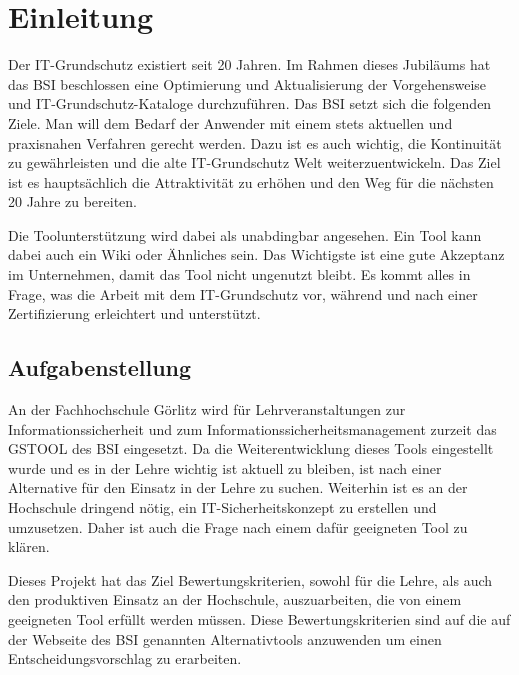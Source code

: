 \section{Einleitung}
Der IT-Grundschutz existiert seit 20 Jahren. Im Rahmen dieses Jubiläums hat das BSI beschlossen eine Optimierung und Aktualisierung der Vorgehensweise und IT-Grundschutz-Kataloge durchzuführen\cite{bsi}. Das BSI setzt sich die folgenden Ziele. Man will dem Bedarf der Anwender mit einem stets aktuellen und praxisnahen Verfahren gerecht werden. Dazu ist es auch wichtig, die Kontinuität zu gewährleisten und die alte IT-Grundschutz Welt weiterzuentwickeln. Das Ziel ist es hauptsächlich die Attraktivität zu erhöhen und den Weg für die nächsten 20 Jahre zu bereiten.

Die Toolunterstützung wird dabei als unabdingbar angesehen. Ein Tool kann dabei auch ein Wiki oder Ähnliches sein. Das Wichtigste ist eine gute Akzeptanz im Unternehmen, damit das Tool nicht ungenutzt bleibt. Es kommt alles in Frage, was die Arbeit mit dem IT-Grundschutz vor, während und nach einer Zertifizierung erleichtert und unterstützt.

\subsection{Aufgabenstellung}
An der Fachhochschule Görlitz wird für Lehrveranstaltungen zur Informationssicherheit und zum
Informationssicherheitsmanagement zurzeit das GSTOOL des BSI eingesetzt. Da die Weiterentwicklung dieses Tools eingestellt wurde und es in der Lehre wichtig ist aktuell zu bleiben, ist nach einer Alternative für den Einsatz in der Lehre zu suchen. 
Weiterhin ist es an der Hochschule dringend nötig, ein IT-Sicherheitskonzept zu erstellen und umzusetzen. Daher ist auch die Frage nach einem dafür geeigneten Tool zu klären. 

Dieses Projekt hat das Ziel Bewertungskriterien, sowohl für die Lehre, als auch den produktiven Einsatz an der Hochschule, auszuarbeiten, die von einem geeigneten Tool erfüllt werden müssen. Diese Bewertungskriterien sind auf die auf der Webseite des BSI genannten Alternativtools anzuwenden um einen Entscheidungsvorschlag zu erarbeiten.

